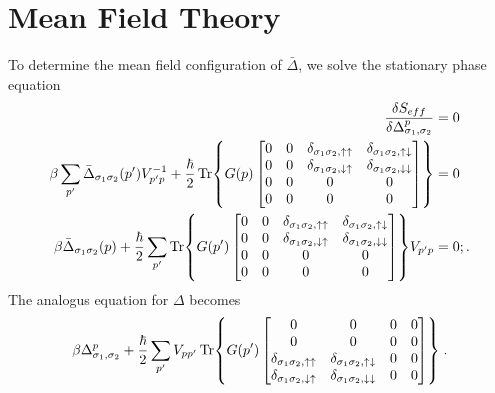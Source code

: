 \documentclass{article}
\begin{document}
\section{Mean Field Theory}
To determine the mean field configuration of $\bar{\Delta}$, we solve the stationary phase equation
\begin{align}
    \frac{\delta S_{eff}}{\delta \Delta_{\sigma_1,\sigma_2}^{p}} &= 0 \nonumber\\
    \beta\sum_{p'} \bar{\Delta}_{\sigma_1 \sigma_2}(p') V^{-1}_{p' p} + \frac{\hbar}{2} \Tr{G(p) 
    \begin{bmatrix}
    0 & 0 & \delta_{\sigma_1 \sigma_2, \uparrow \uparrow} & \delta_{\sigma_1 \sigma_2, \uparrow \downarrow} \\
    0 & 0 & \delta_{\sigma_1 \sigma_2, \downarrow \uparrow} & \delta_{\sigma_1 \sigma_2, \downarrow \downarrow} \\ 
    0 & 0 & 0 & 0 \\ 
    0 & 0 & 0 & 0
    \end{bmatrix}} &=0 \label{stationary phase deltabar}\\
    \beta \bar{\Delta}_{\sigma_1 \sigma_2}(p) + \frac{\hbar}{2} \sum_{p'} \Tr{G(p') 
    \begin{bmatrix}
    0 & 0 & \delta_{\sigma_1 \sigma_2, \uparrow \uparrow} & \delta_{\sigma_1 \sigma_2, \uparrow \downarrow} \\
    0 & 0 & \delta_{\sigma_1 \sigma_2, \downarrow \uparrow} & \delta_{\sigma_1 \sigma_2, \downarrow \downarrow} \\ 
    0 & 0 & 0 & 0 \\ 
    0 & 0 & 0 & 0
    \end{bmatrix}} V_{p' p} &=0 \nonumber;.
\end{align}
The analogus equation for $\Delta$ becomes
\begin{align}
    \beta \Delta_{\sigma_1,\sigma_2}^p + \frac{\hbar}{2} \sum_{p'} V_{pp'} \Tr{G(p') 
    \begin{bmatrix}
    0 & 0 & 0 & 0 \\
    0 & 0 & 0 & 0 \\ 
    \delta_{\sigma_1 \sigma_2, \uparrow \uparrow} & \delta_{\sigma_1 \sigma_2, \uparrow \downarrow} & 0 & 0 \\ 
    \delta_{\sigma_1 \sigma_2, \downarrow \uparrow} & \delta_{\sigma_1 \sigma_2, \downarrow \downarrow} & 0 & 0
    \end{bmatrix}}\;. \label{stationary phase delta}
\end{align}
\end{document}
